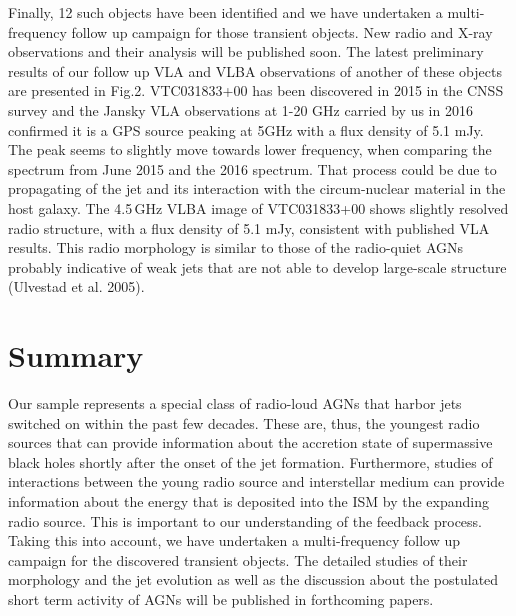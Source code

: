 \documentclass[utf8]{frontiersSCNS} %
\begin{document}
Finally, 12 such objects have been identified and we have undertaken a multi-frequency follow up campaign for those transient objects. New radio and X-ray observations and their analysis will be published soon. 
The latest preliminary results of our follow up VLA and VLBA observations of another of these objects are presented in Fig.2. VTC031833+00 has been discovered in 2015 in the CNSS survey and the Jansky VLA observations at 1-20 GHz carried by us in 2016 confirmed it is a GPS source peaking at 5GHz with a flux density of 5.1 mJy. The peak seems to slightly move towards lower frequency, when comparing the spectrum from June 2015 and the 2016 spectrum. That process could be due to propagating of the jet and its interaction with the circum-nuclear material in the host galaxy. The 4.5\,GHz VLBA image of VTC031833+00 shows slightly resolved radio structure, with a flux density of 5.1 mJy, consistent with published VLA results. This radio morphology is similar to those of the radio-quiet AGNs probably indicative of weak jets that are not able to develop large-scale structure (Ulvestad et al. 2005). 









\section{Summary}

Our sample represents a special class of radio-loud AGNs that harbor jets switched on within the past few decades.
These are, thus, the youngest radio sources that can provide information about the accretion state of supermassive black holes shortly after the onset of the jet formation. Furthermore, 
studies of interactions between the young radio source and interstellar medium can provide information about the energy that is deposited into the ISM by the expanding radio source. 
This is important to our understanding of the feedback process.
Taking this into account, we have undertaken a multi-frequency follow up campaign for the discovered transient objects. 
The detailed studies of their morphology and the jet evolution as well as the discussion about the postulated short term activity of AGNs will be published in forthcoming papers. 
\end{document}
